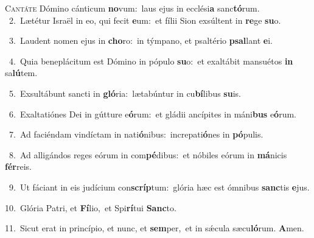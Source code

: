 \lettrine{\initial\textcolor{\initialcolor}{C}}{antáte} Dómino cánticum \textbf{no}\-vum:~\star laus ejus in ecclési\textbf{a} sanc\-\textbf{tó}\-rum.\\
{\numbfont\textcolor{\numbcolor}{~2.}}~Lætétur Israël in eo, qui fecit \textbf{e}\-um:~\star et fílii Sion exsúltent in \textbf{re}\-ge \textbf{su}\-o.\par
{\numbfont\textcolor{\numbcolor}{~3.}}~Laudent nomen ejus in \textbf{cho}\-ro:~\star in týmpano, et psaltério \textbf{psal}\-lant \textbf{e}\-i.\par
{\numbfont\textcolor{\numbcolor}{~4.}}~Quia beneplácitum est Dómino in pópulo \textbf{su}\-o:~\star et exaltábit mansuétos \textbf{in} sa\-\textbf{lú}\-tem.\par
{\numbfont\textcolor{\numbcolor}{~5.}}~Exsultábunt sancti in \textbf{gló}\-ria:~\star lætabúntur in cu\-\textbf{bí}\-libus \textbf{su}\-is.\par
{\numbfont\textcolor{\numbcolor}{~6.}}~Exaltatiónes Dei in gútture e\-\textbf{ó}\-rum:~\star et gládii ancípites in máni\textbf{bus} e\-\textbf{ó}\-rum.\par
{\numbfont\textcolor{\numbcolor}{~7.}}~Ad faciéndam vindíctam in nati\-\textbf{ó}\-nibus:~\star increpati\-\textbf{ó}\-nes in \textbf{pó}\-pulis.\par
{\numbfont\textcolor{\numbcolor}{~8.}}~Ad alligándos reges eórum in com\-\textbf{pé}\-dibus:~\star et nóbiles eórum in \textbf{má}\-nicis \textbf{fér}\-reis.\par
{\numbfont\textcolor{\numbcolor}{~9.}}~Ut fáciant in eis judícium con\-\textbf{scríp}\-tum:~\star glória hæc est ómnibus \textbf{sanc}\-tis \textbf{e}\-jus.\par
{\numbfont\textcolor{\numbcolor}{10.}}~Glória Patri, et \textbf{Fí}\-lio,~\star et Spi\-\textbf{rí}\-tui \textbf{Sanc}\-to.\par
{\numbfont\textcolor{\numbcolor}{11.}}~Sicut erat in princípio, et nunc, et \textbf{sem}\-per,~\star et in sǽcula sæcu\-\textbf{ló}\-rum. \textbf{A}\-men.\par
